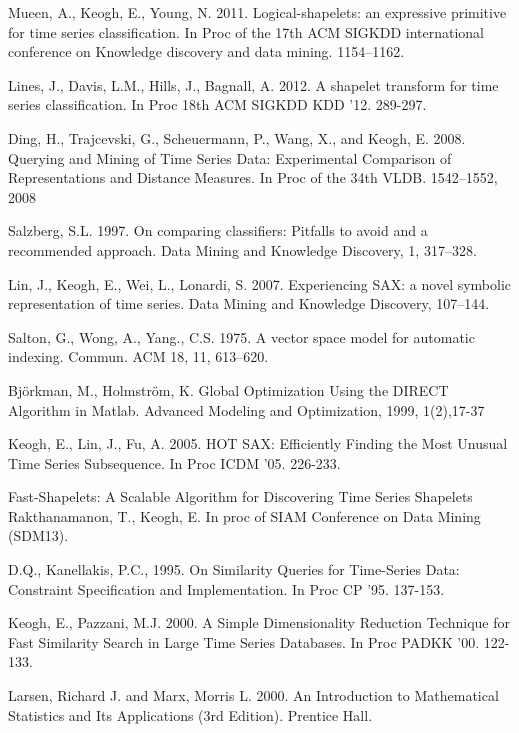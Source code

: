 \documentclass{llncs}
\begin{document}
\begin{thebibliography}{5}
Mueen, A., Keogh, E., Young, N. 2011.
Logical-shapelets: an expressive primitive for time series classification.
In Proc of the 17th ACM SIGKDD international conference on Knowledge discovery and data
mining. 1154--1162.

Lines, J., Davis, L.M., Hills, J., Bagnall, A. 2012.
A shapelet transform for time series classification. 
In Proc 18th ACM SIGKDD KDD '12. 289-297.

Ding, H., Trajcevski, G., Scheuermann, P., Wang, X., and Keogh, E. 2008.
Querying and Mining of Time Series Data: Experimental Comparison of Representations and Distance
Measures. 
In Proc of the 34th VLDB. 1542–1552, 2008

Salzberg, S.L. 1997.
On comparing classifiers: Pitfalls to avoid and a recommended approach. 
Data Mining and Knowledge Discovery, 1, 317–328.

Lin, J., Keogh, E., Wei, L., Lonardi, S. 2007.
Experiencing SAX: a novel symbolic representation of time series.
Data Mining and Knowledge Discovery, 107--144.

Salton, G., Wong, A., Yang., C.S. 1975.
A vector space model for automatic indexing. 
Commun. ACM 18, 11, 613--620.

Björkman, M., Holmström, K.
Global Optimization Using the DIRECT Algorithm in Matlab.
Advanced Modeling and Optimization, 1999, 1(2),17-37

Keogh, E., Lin, J., Fu, A. 2005.
HOT SAX: Efficiently Finding the Most Unusual Time Series Subsequence. 
In Proc ICDM '05. 226-233.

Fast-Shapelets: A Scalable Algorithm for Discovering Time Series Shapelets
Rakthanamanon, T., Keogh, E.
In proc of SIAM Conference on Data Mining (SDM13).

D.Q., Kanellakis, P.C., 1995.
On Similarity Queries for Time-Series Data: Constraint Specification and Implementation. 
In Proc CP '95. 137-153.

Keogh, E., Pazzani, M.J. 2000.
A Simple Dimensionality Reduction Technique for Fast Similarity Search in Large Time Series
Databases. 
In Proc PADKK '00. 122-133.

Larsen, Richard J. and Marx, Morris L. 2000. 
An Introduction to Mathematical Statistics and Its Applications (3rd Edition).
Prentice Hall.


\end{thebibliography}
\end{document}
